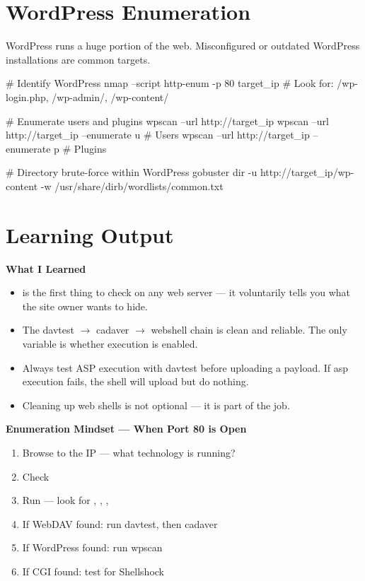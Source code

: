 \begin{notebox}

\section{WordPress Enumeration}
\label{sec:wordpress}

WordPress runs a huge portion of the web. Misconfigured or outdated WordPress
installations are common targets.

\begin{termbox}
# Identify WordPress
nmap --script http-enum -p 80 target_ip
# Look for: /wp-login.php, /wp-admin/, /wp-content/

# Enumerate users and plugins
wpscan --url http://target_ip
wpscan --url http://target_ip --enumerate u    # Users
wpscan --url http://target_ip --enumerate p    # Plugins

# Directory brute-force within WordPress
gobuster dir -u http://target_ip/wp-content -w /usr/share/dirb/wordlists/common.txt
\end{termbox}

\section{Learning Output}

\begin{takebox}
\textbf{What I Learned}
\begin{itemize}
  \item {} is the first thing to check on any web server --- it
        voluntarily tells you what the site owner wants to hide.
  \item The davtest $\rightarrow$ cadaver $\rightarrow$ webshell chain is clean
        and reliable. The only variable is whether  execution is enabled.
  \item Always test ASP execution with davtest before uploading a payload. If asp
        execution fails, the shell will upload but do nothing.
  \item Cleaning up web shells is not optional --- it is part of the job.
\end{itemize}

\textbf{Enumeration Mindset --- When Port 80 is Open}
\begin{enumerate}
  \item Browse to the IP --- what technology is running?
  \item Check 
  \item Run  --- look for , ,
        , 
  \item If WebDAV found: run davtest, then cadaver
  \item If WordPress found: run wpscan
  \item If CGI found: test for Shellshock
\end{enumerate}


\end{takebox}
\end{notebox}
